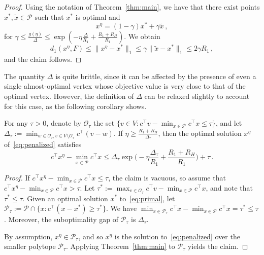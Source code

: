 \documentclass[final,12pt]{colt2018}
\newcommand{\cO}{\mathcal{O}}
\newcommand{\cP}{\mathcal{P}}
\newcommand{\1}{\mathds{1}}
\begin{document}
\begin{proof}
Using the notation of Theorem~\ref{thm:main}, we have that there exist points $x^*, \tilde x \in \cP$ such that $x^*$ is optimal and
\begin{equation*}
x^\eta = (1-\gamma) x^* + \gamma \tilde x\,,
\end{equation*}
for $\gamma \leq \frac{g(\eta)}{\Delta} \leq \exp\left(-\eta\frac{\Delta}{R_1} + \frac{R_1 + R_H}{R_1}\right)$.
We obtain
\begin{equation*}
d_1(x^\eta, F) \leq \|x^\eta - x^*\|_1 \leq \gamma \|\tilde x - x^*\|_1 \leq 2 \gamma R_1\,,
\end{equation*}
and the claim follows.
\end{proof}

The quantity $\Delta$ is quite brittle, since it can be affected by the presence of even a single almost-optimal vertex whose objective value is very close to that of the optimal vertex.
However, the definition of $\Delta$ can be relaxed slightly to account for this case, as the following corollary shows.
\begin{corollary}
For any $\tau > 0$, denote by $\cO_\tau$ the set $\{v \in V: c^\top v - \min_{x \in \cP} c^\top x \leq \tau\}$, and let $\Delta_\tau := \min_{w \in \cO_\tau, v \in V \setminus \cO_\tau} c^\top (v - w)$.
If $\eta \geq \frac{R_1 + R_H}{\Delta_\tau}$, then the optimal solution $x^\eta$ of~\eqref{eq:penalized} satisfies
\begin{equation*}
c^\top x^\eta - \min_{x \in \cP} c^\top x \leq \Delta_\tau \exp\Big(-\eta \frac{\Delta_\tau}{R_1} + \frac{R_1 + R_H}{R_1}\Big) + \tau\,.
\end{equation*}
\end{corollary}
\begin{proof}
If $c^\top x^\eta - \min_{x \in \cP} c^\top x \leq \tau$, the claim is vacuous, so assume that $c^\top x^\eta - \min_{x \in \cP} c^\top x > \tau$.
Let $\tau^* := \max_{v \in \cO_\tau} c^\top v - \min_{x \in \cP} c^\top x$, and note that $\tau^* \leq \tau$.
Given an optimal solution $x^*$ to~\eqref{eq:primal}, let $\cP_\tau := \cP \cap \{x: c^\top (x - x^*) \geq \tau^*\}$.
We have $\min_{x \in \cP_\tau} c^\top x - \min_{x  \in \cP} c^\top x = \tau^* \leq \tau$.
Moreover, the suboptimality gap of $\cP_\tau$ is $\Delta_\tau$.

By assumption, $x^\eta \in \cP_\tau$, and so $x^\eta$ is the solution to~\eqref{eq:penalized} over the smaller polytope $\cP_\tau$.
Applying Theorem~\ref{thm:main} to $\cP_\tau$ yields the claim.
\end{proof}
\end{document}
